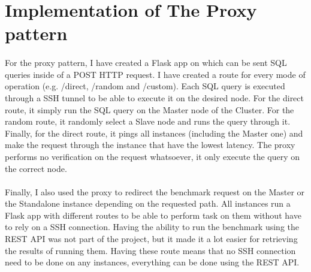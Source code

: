 \pagebreak\section{Implementation of The Proxy pattern} \label{T2}

\paragraph{}For the proxy pattern, I have created a Flask app on which can be sent SQL queries inside of a POST HTTP request. I have created a route for every mode of operation (e.g. /direct, /random and /custom). Each SQL query is executed through a SSH tunnel to be able to execute it on the desired node. For the direct route, it simply run the SQL query on the Master node of the Cluster. For the random route, it randomly select a Slave node and runs the query through it. Finally, for the direct route, it pings all instances (including the Master one) and make the request through the instance that have the lowest latency. The proxy performs no verification on the request whatsoever, it only execute the query on the correct node.

\paragraph{}Finally, I also used the proxy to redirect the benchmark request on the Master or the Standalone instance
depending on the requested path. All instances run a Flask app with different routes to be able to perform task
on them without have to rely on a SSH connection. Having the ability to run the benchmark using the REST
API was not part of the project, but it made it a lot easier for retrieving the results of running them. Having
these route means that no SSH connection need to be done on any instances, everything can be done using
the REST API.